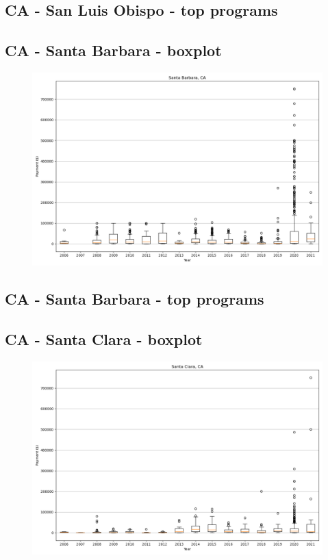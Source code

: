 \subsection*{CA - San Luis Obispo - top programs}

\newpage
\subsection*{CA - Santa Barbara - boxplot}
\begin{figure}[h]
\centering
\includegraphics[width=7in]{../output/boxplots/counties/Santa Barbara-CA_boxplot.png}
\end{figure}


\subsection*{CA - Santa Barbara - top programs}

\newpage
\subsection*{CA - Santa Clara - boxplot}
\begin{figure}[h]
\centering
\includegraphics[width=7in]{../output/boxplots/counties/Santa Clara-CA_boxplot.png}
\end{figure}


